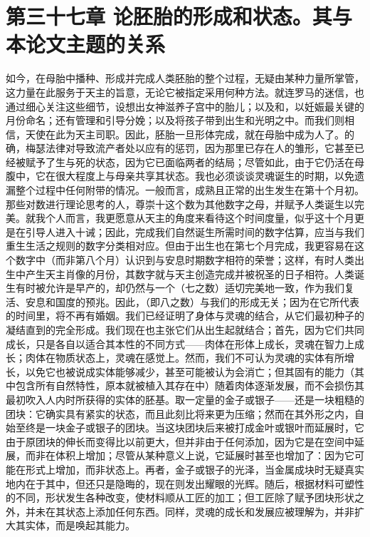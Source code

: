 
\section{第三十七章 论胚胎的形成和状态。其与本论文主题的关系}

如今，在母胎中播种、形成并完成人类胚胎的整个过程，无疑由某种力量所掌管，这力量在此服务于天主的旨意，无论它被指定采用何种方法。就连罗马的迷信，也通过细心关注这些细节，设想出女神滋养子宫中的胎儿；以及和，以妊娠最关键的月份命名；还有管理和引导分娩；以及将孩子带到出生和光明之中。而我们则相信，天使在此为天主司职。因此，胚胎一旦形体完成，就在母胎中成为人了。的确，梅瑟法律对导致流产者处以应有的惩罚，因为那里已存在人的雏形，它甚至已经被赋予了生与死的状态，因为它已面临两者的结局；尽管如此，由于它仍活在母腹中，它在很大程度上与母亲共享其状态。我也必须谈谈灵魂诞生的时期，以免遗漏整个过程中任何附带的情况。一般而言，成熟且正常的出生发生在第十个月初。那些对数进行理论思考的人，尊崇十这个数为其他数字之母，并赋予人类诞生以完美。就我个人而言，我更愿意从天主的角度来看待这个时间度量，似乎这十个月更是在引导人进入十诫；因此，完成我们自然诞生所需时间的数字估算，应当与我们重生生活之规则的数字分类相对应。但由于出生也在第七个月完成，我更容易在这个数字中（而非第八个月）认识到与安息时期数字相符的荣誉；这样，有时人类出生中产生天主肖像的月份，其数字就与天主创造完成并被祝圣的日子相符。人类诞生有时被允许是早产的，却仍然与一个（七之数）适切完美地一致，作为我们复活、安息和国度的预兆。因此，（即八之数）与我们的形成无关；因为在它所代表的时间里，将不再有婚姻。我们已经证明了身体与灵魂的结合，从它们最初种子的凝结直到的完全形成。我们现在也主张它们从出生起就结合；首先，因为它们共同成长，只是各自以适合其本性的不同方式——肉体在形体上成长，灵魂在智力上成长；肉体在物质状态上，灵魂在感觉上。然而，我们不可认为灵魂的实体有所增长，以免它也被说成实体能够减少，甚至可能被认为会消亡；但其固有的能力（其中包含所有自然特性，原本就被植入其存在中）随着肉体逐渐发展，而不会损伤其最初吹入人内时所获得的实体的胚基。取一定量的金子或银子——还是一块粗糙的团块：它确实具有紧实的状态，而且此刻比将来更为压缩；然而在其外形之内，自始至终是一块金子或银子的团块。当这块团块后来被打成金叶或银叶而延展时，它由于原团块的伸长而变得比以前更大，但并非由于任何添加，因为它是在空间中延展，而非在体积上增加；尽管从某种意义上说，它延展时甚至也增加了：因为它可能在形式上增加，而非状态上。再者，金子或银子的光泽，当金属成块时无疑真实地内在于其中，但还只是隐晦的，现在则发出耀眼的光辉。随后，根据材料可塑性的不同，形状发生各种改变，使材料顺从工匠的加工；但工匠除了赋予团块形状之外，并未在其状态上添加任何东西。同样，灵魂的成长和发展应被理解为，并非扩大其实体，而是唤起其能力。\par


